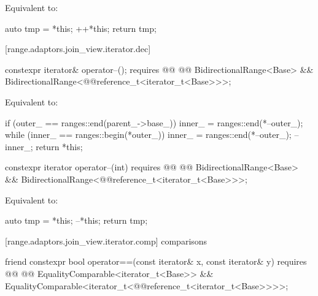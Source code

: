 {\begin{itemdescr}
\pnum
\effects Equivalent to:
\begin{codeblock}
auto tmp = *this;
++*this;
return tmp;
\end{codeblock}
\end{itemdescr}

[range.adaptors.join_view.iterator.dec]{}

\begin{itemdecl}
constexpr iterator& operator--();
  requires @@
    @@ BidirectionalRange<Base> &&
    BidirectionalRange<@@reference_t<iterator_t<Base>>>;
\end{itemdecl}

\begin{itemdescr}
\pnum
\effects Equivalent to:
\begin{codeblock}
if (outer_ == ranges::end(parent_->base_))
  inner_ = ranges::end(*--outer_);
while (inner_ == ranges::begin(*outer_))
  inner_ = ranges::end(*--outer_);
--inner_;
return *this;
\end{codeblock}
\end{itemdescr}

\begin{itemdecl}
constexpr iterator operator--(int)
  requires @@
    @@ BidirectionalRange<Base> &&
    BidirectionalRange<@@reference_t<iterator_t<Base>>>;
\end{itemdecl}

\begin{itemdescr}
\pnum
\effects Equivalent to:
\begin{codeblock}
auto tmp = *this;
--*this;
return tmp;
\end{codeblock}
\end{itemdescr}

[range.adaptors.join_view.iterator.comp]{ comparisons}

\begin{itemdecl}
friend constexpr bool operator==(const iterator& x, const iterator& y)
  requires @@
    @@ EqualityComparable<iterator_t<Base>> &&
    EqualityComparable<iterator_t<@@reference_t<iterator_t<Base>>>>;
\end{itemdecl}

}
